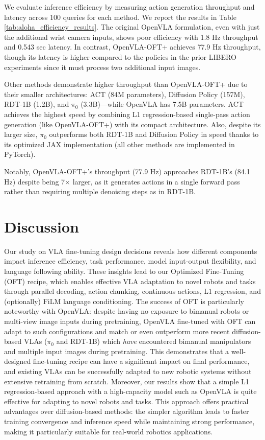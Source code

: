 \documentclass[conference]{IEEEtran}
\begin{document}
We evaluate inference efficiency by measuring action generation throughput and latency across 100 queries for each method. We report the results in Table \ref{tab:aloha_efficiency_results}. The original OpenVLA formulation, even with just the additional wrist camera inputs, shows poor efficiency with 1.8 Hz throughput and 0.543 sec latency. In contrast, OpenVLA-OFT+ achieves 77.9 Hz throughput, though its latency is higher compared to the policies in the prior LIBERO experiments since it must process two additional input images.

Other methods demonstrate higher throughput than OpenVLA-OFT+ due to their smaller architectures: ACT (84M parameters), Diffusion Policy (157M), RDT-1B (1.2B), and $\pi_0$ (3.3B)---while OpenVLA has 7.5B parameters. ACT achieves the highest speed by combining L1 regression-based single-pass action generation (like OpenVLA-OFT+) with its compact architecture. Also, despite its larger size, $\pi_0$ outperforms both RDT-1B and Diffusion Policy in speed thanks to its optimized JAX implementation (all other methods are implemented in PyTorch).

Notably, OpenVLA-OFT+'s throughput (77.9 Hz) approaches RDT-1B's (84.1 Hz) despite being 7$\times$ larger, as it generates actions in a single forward pass rather than requiring multiple denoising steps as in RDT-1B.


\section{Discussion}
\label{sec:discussion}

Our study on VLA fine-tuning design decisions reveals how different components impact inference efficiency, task performance, model input-output flexibility, and language following ability. These insights lead to our Optimized Fine-Tuning (OFT) recipe, which enables effective VLA adaptation to novel robots and tasks through parallel decoding, action chunking, continuous actions, L1 regression, and (optionally) FiLM language conditioning. The success of OFT is particularly noteworthy with OpenVLA: despite having no exposure to bimanual robots or multi-view image inputs during pretraining, OpenVLA fine-tuned with OFT can adapt to such configurations and match or even outperform more recent diffusion-based VLAs ($\pi_0$ and RDT-1B) which \emph{have} encountered bimanual manipulators and multiple input images during pretraining. This demonstrates that a well-designed fine-tuning recipe can have a significant impact on final performance, and existing VLAs can be successfully adapted to new robotic systems without extensive retraining from scratch. Moreover, our results show that a simple L1 regression-based approach with a high-capacity model such as OpenVLA is quite effective for adapting to novel robots and tasks. This approach offers practical advantages over diffusion-based methods: the simpler algorithm leads to faster training convergence and inference speed while maintaining strong performance, making it particularly suitable for real-world robotics applications.
\end{document}
